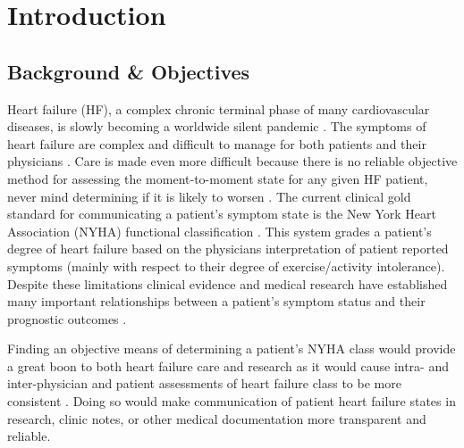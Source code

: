 \documentclass[]{article}
\begin{document}
\begin{abstract}

\end{abstract}

\clearpage

\tableofcontents

\clearpage

\section{Introduction}
\subsection{Background \& Objectives} %

Heart failure (HF), a complex chronic terminal phase of many cardiovascular diseases, is slowly becoming a worldwide silent pandemic \cite{Mehra2015}. The symptoms of heart failure are complex and difficult to manage for both patients and their physicians \cite{HeartandStrokeFoundation2016,Seto2011,Lawrence2016}. Care is made even more difficult because there is no reliable objective method for assessing the moment-to-moment state for any given HF patient, never mind determining if it is likely to worsen \cite{Cox1992,Raphael2007,Bennett2002}. The current clinical gold standard for communicating a patient's symptom state is the New York Heart Association (NYHA) functional classification \cite{HeartFoundation2014,AmericanHeartAssociation2015}. This system grades a patient's degree of heart failure based on the physicians interpretation of patient reported symptoms (mainly with respect to their degree of exercise/activity intolerance). Despite these limitations clinical evidence and medical research have established many important relationships between a patient's symptom status and their prognostic outcomes \cite{Bennett2002,Ahmed2006}. 

Finding an objective means of determining a patient's NYHA class would provide a great boon to both heart failure care and research as it would cause intra- and inter-physician and patient assessments of heart failure class to be more consistent \cite{Goldman1981,Bennett2002, Williams2017}. Doing so would make communication of patient heart failure states in research, clinic notes, or other medical documentation more transparent and reliable.
\end{document}
